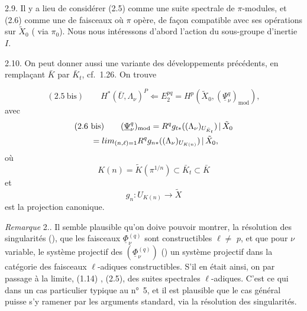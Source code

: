 \documentclass[11pt,a4paper]{article}
\begin{document}
2.9. Il y a lieu de considérer (2.5) comme une suite spectrale de $\pi$-modules, et  (2.6) comme une \uncertain{\ill{}} de faisceaux  où $\pi$ opère, de façon compatible avec ses opérations sur $\tilde X_0$ (\ill{} \ill{} via $\pi_0$). Nous nous intéressons d'abord \ill{} l'action du sous-groupe \struck{\ill{}} d'inertie $I$.

2.10. On peut donner aussi une variante  des développements précédents, en remplaçant $\bar K$ par $\bar K_t$, cf.~1.26. On trouve

\[
(2.5\ \text{bis}) \qquad H^*(\bar U, \Lambda_\nu)^P \Longleftarrow E_2^{pq} = H^p(\tilde X_0, (\underline{\Psi}^q_\nu)_{\mathrm{mod}}) ,
\]
avec
\[
\begin{aligned}
& (2.6\ \text{bis}) \qquad (\underline{\Psi}^q_\nu)_{\mathrm{mod}} = R^q g_{t *}((\Lambda_\nu)_{U_{\bar K_t}}) \,|\, \tilde X_0 \\
& \qquad = \varinjlim_{(n,\ell)=1} R^q g_{n *}((\Lambda_\nu)_{U_{K(n)}}) \,|\, \tilde X_0 ,
\end{aligned}
\]
où
\[
K(n) = \tilde K(\pi^{1/n}) \subset \bar K_t \subset \bar K
\]
et
\[
g_n : U_{K(n)} \to \tilde X
\]
est la projection canonique.


\emph{Remarque} 2.. Il semble plausible qu'on doive pouvoir montrer,  \struck{\ill{}} la résolution des singularités (), que les faisceaux $\underline{\Phi}^{(q)}_\nu$ \struck{\ill{}} sont constructibles  $\ell \neq$ \struck{\ill{}} $p$, et que pour $\nu$ variable, le système projectif des $(\underline{\Phi}^{(q)}_\nu)$ ()   un système projectif dans la catégorie des faisceaux $\ell$-adiques constructibles. S'il en était ainsi, on  par passage à la limite, \add{\uncertain{\ill{}}} \struck{\ill{}}  \struck{(\ill{})} (1.14) \struck{\ill{}},  (2.5), des suites spectrales   $\ell$-adiques. C'est ce qui  dans un cas particulier typique au n°~5, et il est plausible que le cas général puisse s'y ramener par les arguments standard, via la résolution des singularités.
\end{document}
